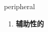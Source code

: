 
\begin{frame}
{\huge peripheral}
\begin{center}
\begin{enumerate}\Large
  \item \textbf{辅助性的}
\end{enumerate}
\end{center}
\end{frame}
